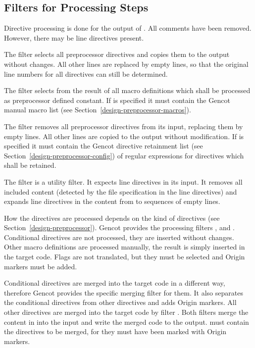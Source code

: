 \subsection{Filters for Processing Steps}
\label{impl-preprocessor-filters}

Directive processing is done for the output of . All comments have been removed. 
However, there may be line directives present. 

The filter  selects all preprocessor directives and
copies them to the output without changes. All other lines are replaced by empty lines, so that the original
line numbers for all directives can still be determined. 

The filter  selects from the result of  all macro definitions
which shall be processed as preprocessor defined constant. If  is specified it must 
contain the Gencot manual macro list (see Section~\ref{design-preprocessor-macros}).

The filter  removes all preprocessor directives from its input, replacing them by empty
lines. All other lines are copied to the output without modification. If  is specified it must 
contain the Gencot directive retainment list (see Section~\ref{design-preprocessor-config}) of regular 
expressions for directives which shall be retained.

The filter  is a utility filter. It expects line directives in its input. It removes all
included content (detected by the file specification in the line directives) and expands line directives
in the content from  to sequences of empty lines.

How the directives are processed depends on the kind of directives (see Section~\ref{design-preprocessor}).
Gencot provides the processing filters ,  and 
. 
Conditional directives are not processed, they are inserted without changes. Other macro
definitions are processed manually, the result is simply inserted in the target code. Flags are not translated,
but they must be selected and Origin markers must be added.

Conditional directives are merged into the target code in a different way, therefore Gencot provides 
the specific merging filter  for them. It also separates the conditional
directives from other directives and adds Origin markers. All other directives are merged into the 
target code by filter . Both filters merge the content in  
into the input and write the merged code to the output.  must contain the directives to be merged,
for  they must have been marked with Origin markers.

